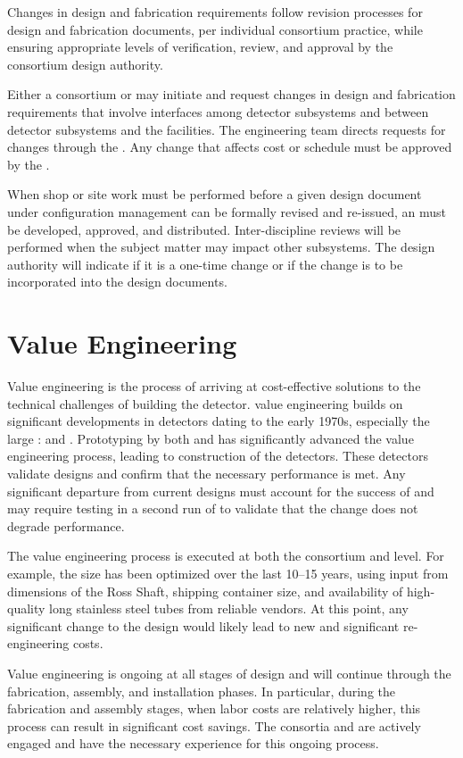 Changes in design and fabrication requirements follow revision
processes for design and fabrication documents, per individual
consortium practice, while ensuring appropriate levels of
verification, review, and approval by the consortium design authority.

Either a consortium or  may initiate and request
changes in design and fabrication requirements that involve interfaces among detector subsystems and between detector subsystems and the facilities.  The
 engineering team directs requests for changes through the
. Any change that affects cost or schedule must be approved
by the .

When shop or site work must be performed before a given 
design
document under configuration management can be formally revised and re-issued, 
an  must be developed, approved, and distributed. 
Inter-discipline reviews will be
performed when the  subject matter may impact other
subsystems. The design authority will indicate if it is a one-time
change or if the change is to be incorporated into the design
documents. 



\section{Value Engineering}
\label{sec:fdsp-coord-ve}

Value engineering is the process of arriving at cost-effective
solutions to the technical challenges of building the 
detector.  value engineering builds on significant
developments in  detectors dating to the early 1970s,
especially the large :  and
. Prototyping by both  and  has
significantly advanced the value engineering process, leading to
construction of the  detectors. These detectors validate
 designs and confirm that the necessary performance is
met. Any significant departure from current designs must account for
the success of   and may require testing in a second
run of  to validate that the change does not degrade performance. 

The value engineering process is executed at both the consortium and
 level. For example, the  size has been optimized
over the last 10--15 years, using input from dimensions of the Ross
Shaft, shipping container size, and availability of high-quality long
stainless steel tubes from reliable vendors.  At this point, any
significant change to the  design would likely lead to new
and significant re-engineering costs.

Value engineering is ongoing at all stages of design and will continue
through the fabrication, assembly, and installation phases. In
particular, during the fabrication and assembly stages, when labor costs
are relatively higher, this process can result in significant cost savings. The
consortia and  are actively engaged and have the necessary
experience for this ongoing process.
